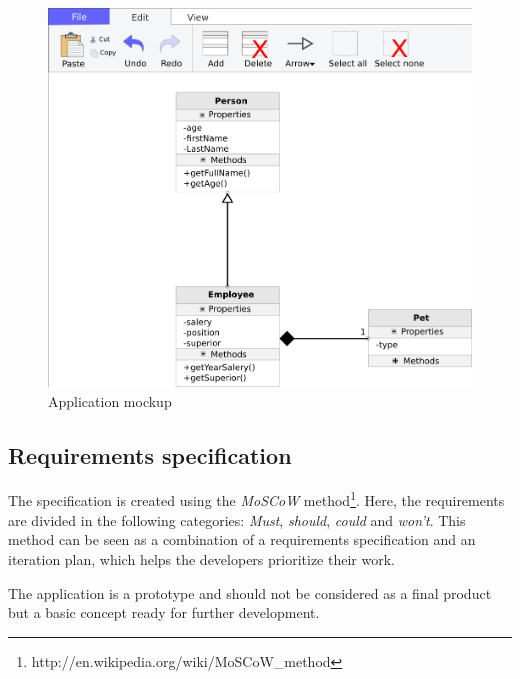 \begin{figure}[H]
\centering
\includegraphics[width=\linewidth]{img/mockup}
\caption{Application mockup \label{mockup}}
\end{figure}

\newpage
\subsection{Requirements specification}
The specification is created using the \textit{MoSCoW} 
method\footnote{http://en.wikipedia.org/wiki/MoSCoW\_method}. Here, the 
requirements 
are divided in the following categories: \textit{Must}, \textit{should}, 
\textit{could} and \textit{won't}. This method can be seen as a combination of 
a requirements specification and an iteration plan, which helps the developers 
prioritize their work.

The application is a prototype and should not be considered as a final product 
but a basic concept ready for further development.

